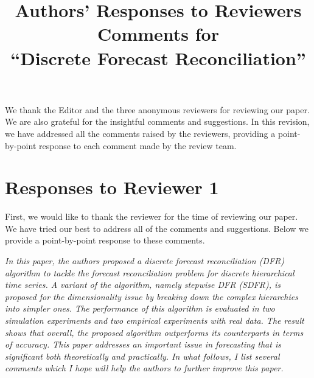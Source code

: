 \documentclass[11pt,a4paper]{article}
\title{\bf\Large Authors' Responses to Reviewers Comments for \\
  ``Discrete Forecast Reconciliation'' }
\author{}
\date{}
\newcommand{\RE}[2][Re:~]{{\color{blue}\textbf{#1}#2}}
\begin{document}
\maketitle

\RE[]{We thank the Editor and the three anonymous reviewers for reviewing our paper. We are also grateful for the insightful comments and suggestions. In this revision, we have addressed all the comments raised by the reviewers, providing a point-by-point response to each comment made by the review team.}

\section*{Responses to Reviewer 1}\label{reviewer-1-comments}

\RE[]{First, we would like to thank the reviewer for the time of reviewing our paper. We have tried our best to address all of the comments and suggestions. Below we provide a point-by-point response to these comments.}

\textit{In this paper, the authors proposed a discrete forecast reconciliation (DFR) algorithm to tackle the forecast reconciliation problem for discrete hierarchical time series. A variant of the algorithm, namely stepwise DFR (SDFR), is proposed for the dimensionality issue by breaking down the complex hierarchies into simpler ones. The performance of this algorithm is evaluated in two simulation experiments and two empirical experiments with real data. The result shows that overall, the proposed algorithm outperforms its counterparts in terms of accuracy. This paper addresses an important issue in forecasting that is significant both theoretically and practically. In what follows, I list several comments which I hope will help the authors to further improve this paper.}
\end{document}
